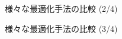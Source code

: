 \begin{frame}[t,fragile]{様々な最適化手法の比較 (2/4)}
  \begin{center}
  \end{center}
\end{frame}

\begin{frame}[t,fragile]{様々な最適化手法の比較 (3/4)}
  \begin{center}
  \end{center}
\end{frame}

